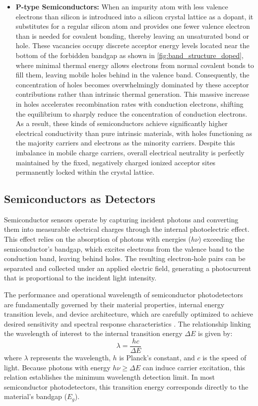 \begin{itemize}
  \item \textbf{P-type Semiconductors:} When an impurity atom with less valence electrons than silicon is introduced into a silicon crystal lattice as a dopant, it substitutes for a regular silicon atom and provides one fewer valence electron than is needed for covalent bonding, thereby leaving an unsaturated bond or hole. These vacancies occupy discrete acceptor energy levels located near the bottom of the forbidden bandgap as shown in \cref{fig:band_structure_doped}, where minimal thermal energy allows electrons from normal covalent bonds to fill them, leaving mobile holes behind in the valence band. Consequently, the concentration of holes becomes overwhelmingly dominated by these acceptor contributions rather than intrinsic thermal generation. This massive increase in holes accelerates recombination rates with conduction electrons, shifting the equilibrium to sharply reduce the concentration of conduction electrons. As a result, these kinds of semiconductors achieve significantly higher electrical conductivity than pure intrinsic materials, with holes functioning as the majority carriers and electrons as the minority carriers. Despite this imbalance in mobile charge carriers, overall electrical neutrality is perfectly maintained by the fixed, negatively charged ionized acceptor sites permanently locked within the crystal lattice.
\end{itemize}

\subsection{Semiconductors as Detectors}

Semiconductor sensors operate by capturing incident photons and converting them into measurable electrical charges through the internal photoelectric effect. This effect relies on the absorption of photons with energies ($h\nu$) exceeding the semiconductor's bandgap, which excites electrons from the valence band to the conduction band, leaving behind holes. The resulting electron-hole pairs can be separated and collected under an applied electric field, generating a photocurrent that is proportional to the incident light intensity. 

The performance and operational wavelength of semiconductor photodetectors are fundamentally governed by their material properties, internal energy transition levels, and device architecture, which are carefully optimized to achieve desired sensitivity and spectral response characteristics \cite[Chap 13.]{szePhysicsSemiconductorDevices2007}. The relationship linking the wavelength of interest to the internal transition energy $\Delta E$ is given by:
\begin{equation}
    \lambda = \frac{hc}{\Delta E}
    \label{eq:photon_energy}
\end{equation}
where $\lambda$ represents the wavelength, $h$ is Planck's constant, and $c$ is the speed of light. Because photons with energy $h\nu \ge \Delta E$ can induce carrier excitation, this relation establishes the minimum wavelength detection limit. In most semiconductor photodetectors, this transition energy corresponds directly to the material's bandgap ($E_g$).

